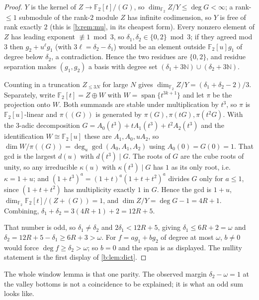 \documentclass[11pt]{amsart}
\theoremstyle{definition}
\theoremstyle{remark}
\begin{document}
\begin{proof}
$Y$ is the kernel of $Z \to \mathbb{F}_2[t]/(G)$, so $\dim_{\mathbb{F}_2} Z/Y \le \deg G < \infty$; a rank-$\le 1$ submodule of the rank-$2$ module $Z$ has infinite codimension, so $Y$ is free of rank exactly $2$ (this is \cref{b:rem:mu}, in its cheapest form). Every nonzero element of $Z$ has leading exponent $\not\equiv 1 \bmod 3$, so $\delta_1, \delta_2 \in \{0,2\} \bmod 3$; if they agreed mod $3$ then $g_2 + u^{\ell} g_1$ (with $3\ell = \delta_2 - \delta_1$) would be an element outside $\mathbb{F}_2[u]g_1$ of degree below $\delta_2$, a contradiction. Hence the two residues are $\{0,2\}$, and residue separation makes $(g_1,g_2)$ a basis with degree set $(\delta_1 + 3\mathbb{N}) \cup (\delta_2 + 3\mathbb{N})$.

Counting in a truncation $Z_{\le 3N}$ for large $N$ gives $\dim_{\mathbb{F}_2} Z/Y = (\delta_1 + \delta_2 - 2)/3$. Separately, write $\mathbb{F}_2[t] = Z \oplus W$ with $W = \operatorname{span}\{t^{3k+1}\}$ and let $\pi$ be the projection onto $W$. Both summands are stable under multiplication by $t^3$, so $\pi$ is $\mathbb{F}_2[u]$-linear and $\pi((G))$ is generated by $\pi(G), \pi(tG), \pi(t^2G)$. With the $3$-adic decomposition $G = A_0(t^3) + tA_1(t^3) + t^2A_2(t^3)$ and the identification $W \cong \mathbb{F}_2[u]$ these are $A_1, A_0, uA_2$, so $\dim W/\pi((G)) = \deg_u \gcd(A_0,A_1,A_2)$ using $A_0(0) = G(0) = 1$. That gcd is the largest $d(u)$ with $d(t^3) \mid G$. The roots of $G$ are the cube roots of unity, so any irreducible $\kappa(u)$ with $\kappa(t^3) \mid G$ has $1$ as its only root, i.e.\ $\kappa = 1+u$; and $(1+t^3)^a = (1+t)^a(1+t+t^2)^a$ divides $G$ only for $a \le 1$, since $(1+t+t^2)$ has multiplicity exactly $1$ in $G$. Hence the gcd is $1+u$, $\dim_{\mathbb{F}_2}\mathbb{F}_2[t]/(Z + (G)) = 1$, and $\dim Z/Y = \deg G - 1 = 4R+1$. Combining, $\delta_1 + \delta_2 = 3(4R+1) + 2 = 12R+5$.

That number is odd, so $\delta_1 \ne \delta_2$ and $2\delta_1 < 12R+5$, giving $\delta_1 \le 6R+2 = \omega$ and $\delta_2 = 12R+5-\delta_1 \ge 6R+3 > \omega$. For $f = ag_1 + bg_2$ of degree at most $\omega$, $b \ne 0$ would force $\deg f \ge \delta_2 > \omega$; so $b = 0$ and the span is as displayed. The nullity statement is the first display of \cref{b:lem:dict}.
\end{proof}

The whole window lemma is that one parity. The observed margin $\delta_2 - \omega = 1$ at the valley bottoms is not a coincidence to be explained; it is what an odd sum looks like.
\end{document}
